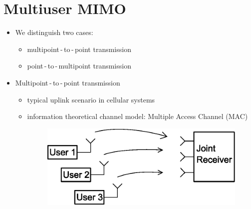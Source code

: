 \documentclass[a4paper, 10pt]{article}
\begin{document}
\setcounter{section}{2}
\tableofcontents
\section{Multiuser MIMO}
\begin{itemize}
	\item We distinguish two cases:
	\begin{itemize}
		\item multipoint\,-\,to\,-\,point transmission
		\item point\,-\,to\,-\,multipoint transmission
	\end{itemize}
	\item Multipoint\,-\,to\,-\,point transmission
	\begin{itemize}
		\item typical uplink scenario in cellular systems
		\item information theoretical channel model: Multiple Access Channel (MAC)
		\begin{figure}[h]\centering
			\includegraphics[scale=0.8]{MAC}
		\end{figure}

\end{itemize}
\end{itemize}
\end{document}
